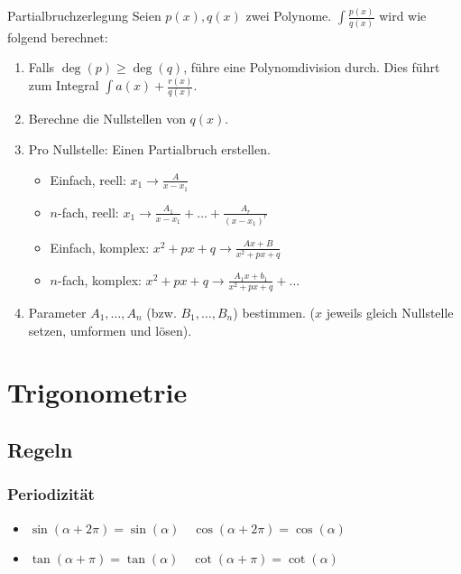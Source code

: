 \documentclass[a4paper,10pt]{article}
\begin{document}
    
    \begin{mainbox}{Partialbruchzerlegung}
        Seien $p(x), q(x)$ zwei Polynome. $\int \frac{p(x)}{q(x)}$ wird wie folgend berechnet:
        \begin{enumerate}
            \item Falls $\deg(p) \ge \deg(q)$, führe eine Polynomdivision durch. Dies führt zum Integral $\int a(x) + \frac{r(x)}{q(x)}$.
            \item Berechne die Nullstellen von $q(x)$.
            \item Pro Nullstelle: Einen Partialbruch erstellen.
                    \begin{adjustwidth}{-1em}{}
                    \begin{itemize}
                        \item Einfach, reell: $x_1 \to \frac{A}{x - x_1}$
                        \item $n$-fach, reell: $x_1 \to \frac{A_1}{x - x_1} + \ldots + \frac{A_r}{(x-x_1)^r}$ 
                        \item Einfach, komplex: $x^2 + px + q \to \frac{Ax + B} {x^2 + px + q}$
                        \item $n$-fach, komplex: $x^2 + px + q \to \frac{A_1x+b_1}{x^2+px+q} + \ldots$
                    \end{itemize}
                    \end{adjustwidth}
            \item Parameter $A_1, \ldots, A_n$ (bzw. $B_1, \ldots, B_n$) bestimmen. ($x$ jeweils gleich Nullstelle setzen, umformen und lösen).
                    
        \end{enumerate}
    \end{mainbox}
    
    \section{Trigonometrie}
    
    \subsection{Regeln}
    \subsubsection{Periodizität}
    \begin{itemize}
        \item $\sin(\alpha + 2 \pi) = \sin(\alpha) \quad \cos(\alpha + 2 \pi) = \cos(\alpha)$
        \item $\tan(\alpha + \pi) = \tan(\alpha) \quad \cot(\alpha + \pi) = \cot(\alpha)$
    \end{itemize}
    
\end{document}
